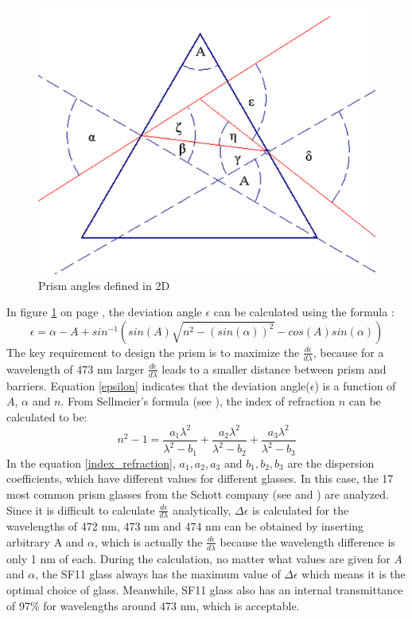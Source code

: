 \begin{figure}[ht!]
\centering
\includegraphics[scale = 0.6]{chapters/img/Prism2D.png}
\caption{Prism angles defined in 2D}
\label{fig:prism2D}
\end{figure} 
In figure \ref{fig:prism2D} on page \pageref{fig:prism2D}, the deviation angle $\epsilon$ can be calculated using the formula \cite{prism_angle_calculation}:
\begin{equation}
\label{epsilon}
\epsilon = \alpha - A + sin^{-1}(sin(A)\sqrt{n^2 - (sin(\alpha))^2} - cos(A)sin(\alpha))
\end {equation}
The key requirement to design the prism is to maximize the $\frac{d\epsilon}{d\lambda}$, because for a wavelength of 473 nm larger $\frac{d\epsilon}{d\lambda}$ leads to a smaller distance between prism and barriers. Equation \ref{epsilon} indicates that the deviation angle($\epsilon$) is a function of $A$, $\alpha$ and $n$. From Sellmeier's formula (see \cite{prism_book}), the index of refraction $n$ can be calculated to be:
\begin{equation}
\label{index_refraction}
n^2 - 1 = \frac{a_{1}\lambda^2}{\lambda^2-b_{1}} + \frac{a_{2}\lambda^2}{\lambda^2-b_{2}} + \frac{a_{3}\lambda^2}{\lambda^2-b_{3}}
\end {equation}
In the equation \ref{index_refraction}, $a_{1}, a_{2}, a_{3}$ and $b_{1}, b_{2}, b_{3}$ are the dispersion coefficients, which have different values for different glasses. In this case, the 17 most common prism glasses from the Schott company (see \cite{prism_material} and \cite{prism_book}) are analyzed. Since it is difficult to calculate $\frac{d\epsilon}{d\lambda}$ analytically, $\Delta\epsilon$ is calculated for the wavelengths of 472 nm, 473 nm and 474 nm can be obtained by inserting arbitrary A and $\alpha$, which is actually the $\frac{d\epsilon}{d\lambda}$ because the wavelength difference is only 1 nm of each. During the calculation, no matter what values are given for $A$ and $\alpha$, the SF11 glass always has the maximum value of $\Delta\epsilon$ which means it is the optimal choice of glass. Meanwhile, SF11 glass also has an internal transmittance of 97\% for wavelengths around 473 nm, which is acceptable.

